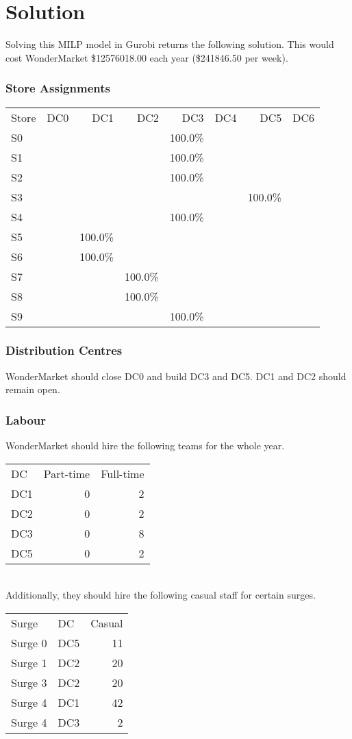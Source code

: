 \documentclass[11pt,a4paper]{article}
\begin{document}
\pagebreak
\part{Solution}
Solving this MILP model in Gurobi returns the following solution.
This would cost WonderMarket \$12576018.00 each year (\$241846.50 per week).

\section{Store Assignments}
\begin{tabular}{l  r  r  r r r r r}
    Store & DC0 & DC1 & DC2 & DC3 & DC4 & DC5 & DC6 \\
    S0 &  &  &  & 100.0\% &  &  &  \\
    S1 &  &  &  & 100.0\% &  &  &  \\
    S2 &  &  &  & 100.0\% &  &  &  \\
    S3 &  &  &  &  &  & 100.0\% &  \\
    S4 &  &  &  & 100.0\% &  &  &  \\
    S5 &  & 100.0\% &  &  &  &  &  \\
    S6 &  & 100.0\% &  &  &  &  &  \\
    S7 &  &  & 100.0\% &  &  &  &  \\
    S8 &  &  & 100.0\% &  &  &  &  \\
    S9 &  &  &  & 100.0\% &  &  &  \\
\end{tabular} 

\section{Distribution Centres}
WonderMarket should close DC0 and build DC3 and DC5. DC1 and DC2 
should remain open.

\section{Labour}
WonderMarket should hire the following teams for the whole year. \\[1em]
\begin{tabular}{l  r  r }
    DC & Part-time & Full-time \\
    DC1 & 0 &2 \\ 
    DC2  & 0 &2 \\ 
    DC3 &  0& 8 \\
    DC5 &  0&2 \\ 
\end{tabular} \\[1em]
Additionally, they should hire the following casual staff for certain 
surges.\\[1em]
\begin{tabular}{l  l  r }
    Surge & DC & Casual \\
    Surge 0 &DC5& 11  \\ 
    Surge 1&DC2 & 20 \\ 
    Surge 3&DC2 & 20 \\
    Surge 4&DC1 & 42 \\ 
    Surge 4&DC3 & 2 \\ 
\end{tabular} 
\end{document}
